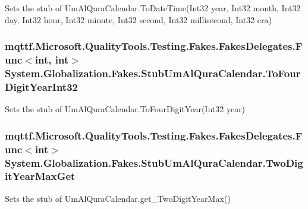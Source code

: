 Sets the stub of Um\-Al\-Qura\-Calendar.\-To\-Date\-Time(\-Int32 year, Int32 month, Int32 day, Int32 hour, Int32 minute, Int32 second, Int32 millisecond, Int32 era)

\hypertarget{class_system_1_1_globalization_1_1_fakes_1_1_stub_um_al_qura_calendar_ae86bbc5282be42f51fdb859876ba4edc}{
\subsubsection[{To\-Four\-Digit\-Year\-Int32}]{\setlength{\rightskip}{0pt plus 5cm}mqttf.\-Microsoft.\-Quality\-Tools.\-Testing.\-Fakes.\-Fakes\-Delegates.\-Func$<$int, int$>$ System.\-Globalization.\-Fakes.\-Stub\-Um\-Al\-Qura\-Calendar.\-To\-Four\-Digit\-Year\-Int32}}\label{class_system_1_1_globalization_1_1_fakes_1_1_stub_um_al_qura_calendar_ae86bbc5282be42f51fdb859876ba4edc}


Sets the stub of Um\-Al\-Qura\-Calendar.\-To\-Four\-Digit\-Year(\-Int32 year)

\hypertarget{class_system_1_1_globalization_1_1_fakes_1_1_stub_um_al_qura_calendar_a8c2a76e43da2f85000b01e7f3f8b91a9}{
\subsubsection[{Two\-Digit\-Year\-Max\-Get}]{\setlength{\rightskip}{0pt plus 5cm}mqttf.\-Microsoft.\-Quality\-Tools.\-Testing.\-Fakes.\-Fakes\-Delegates.\-Func$<$int$>$ System.\-Globalization.\-Fakes.\-Stub\-Um\-Al\-Qura\-Calendar.\-Two\-Digit\-Year\-Max\-Get}}\label{class_system_1_1_globalization_1_1_fakes_1_1_stub_um_al_qura_calendar_a8c2a76e43da2f85000b01e7f3f8b91a9}


Sets the stub of Um\-Al\-Qura\-Calendar.\-get\-\_\-\-Two\-Digit\-Year\-Max()

